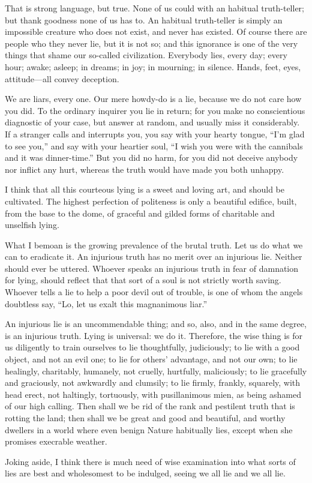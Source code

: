 \documentclass{novelette}
\begin{document}
That is strong language, but true.
None of us could  with an habitual truth-teller;
but thank goodness none of us has to. An habitual truth-teller is simply
an impossible creature who does not exist, and never has existed.
Of course there are people who  they
never lie, but it is not so; and this ignorance is one of the very
things that shame our so-called civilization. Everybody lies, every day;
every hour; awake; asleep; in dreams; in joy; in mourning; in silence.
Hands, feet, eyes, attitude---all convey deception.

We are liars, every one. Our mere {howdy-do}
is a lie, because we do not care how you did.
To the ordinary inquirer you lie in return; for you make
no conscientious diagnostic of your case, but answer at random, and
usually miss it considerably. If a stranger calls and interrupts
you, you say with your hearty tongue, ``I'm glad to see you,'' and say
with your heartier soul, ``I wish you were with the cannibals and it was
dinner-time.'' But you did no harm, for you did not
deceive anybody nor inflict any hurt, whereas the truth would have made
you both unhappy.

I think that all this courteous lying is a sweet and loving art, and
should be cultivated. The highest perfection of politeness is only a
beautiful edifice, built, from the base to the dome, of graceful and
gilded forms of charitable and unselfish lying.

What I bemoan is the growing prevalence of the brutal truth. Let us do
what we can to eradicate it. An injurious truth has no merit over an
injurious lie. Neither should ever be uttered. Whoever speaks an
injurious truth in fear of damnation for lying, should
reflect that that sort of a soul is not strictly worth saving.
Whoever tells a lie to help a poor devil out of trouble, is one of whom the
angels doubtless say, ``Lo, let us exalt this magnanimous liar.''

An injurious lie is an uncommendable thing; and so, also, and in the same
degree, is an injurious truth. Lying is universal: we  do it.
Therefore, the wise thing is for us
diligently to train ourselves to lie thoughtfully, judiciously; to lie
with a good object, and not an evil one; to lie for others' advantage,
and not our own; to lie healingly, charitably, humanely, not cruelly,
hurtfully, maliciously; to lie gracefully and graciously, not awkwardly
and clumsily; to lie firmly, frankly, squarely, with head erect, not
haltingly, tortuously, with pusillanimous mien, as being ashamed of our
high calling. Then shall we be rid of the rank and pestilent truth that
is rotting the land; then shall we be great and good and beautiful, and
worthy dwellers in a world where even benign Nature habitually lies,
except when she promises execrable weather.

Joking aside, I think there is much need of wise examination into what
sorts of lies are best and wholesomest to be indulged, seeing we 
all lie and we  all lie.

\cleartoend
\end{document}
